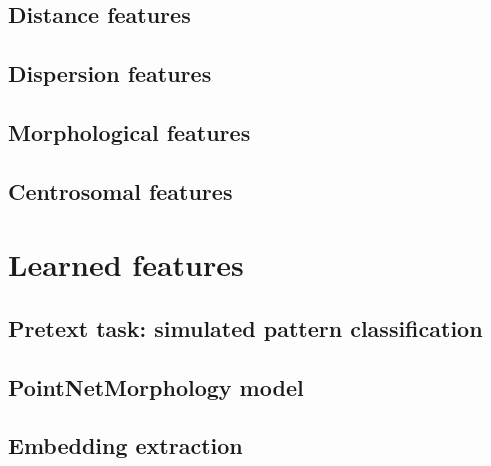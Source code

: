 \subsection{Distance features}

\subsection{Dispersion features}

\subsection{Morphological features}

\subsection{Centrosomal features}


\section{Learned features}


\subsection{Pretext task: simulated pattern classification}

\subsection{PointNetMorphology model}

\subsection{Embedding extraction}
